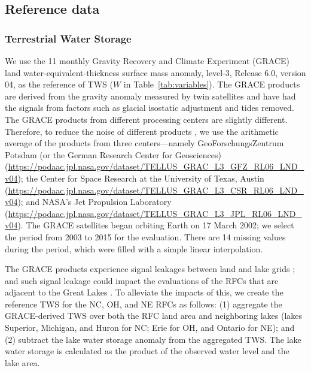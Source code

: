 \documentclass[essd, manuscript]{copernicus}
\begin{document}
\subsection{Reference data}\label{sec:methods:ref}

\subsubsection{Terrestrial Water Storage}\label{sec:methods:ref:tws}

We use the 1\degree{}\times{}1\degree{} monthly Gravity Recovery and Climate Experiment (GRACE) land water-equivalent-thickness surface mass anomaly, level-3, Release 6.0, version 04, as the reference of TWS (\(W\) in Table~\ref{tab:variables}). The GRACE products are derived from the gravity anomaly measured by twin satellites and have had the signals from factors such as glacial isostatic adjustment and tides removed. The GRACE products from different processing centers are slightly different. Therefore, to reduce the noise of different products \citep{sakumura2014GRL}, we use the arithmetic average of the products from three centers---namely GeoForschungsZentrum Potsdam (or the German Research Center for Geosciences) (\url{https://podaac.jpl.nasa.gov/dataset/TELLUS_GRAC_L3_GFZ_RL06_LND_v04}); the Center for Space Research at the University of Texas, Austin (\url{https://podaac.jpl.nasa.gov/dataset/TELLUS_GRAC_L3_CSR_RL06_LND_v04}); and NASA's Jet Propulsion Laboratory (\url{https://podaac.jpl.nasa.gov/dataset/TELLUS_GRAC_L3_JPL_RL06_LND_v04}). The GRACE satellites began orbiting Earth on 17 March 2002; we select the period from 2003 to 2015 for the evaluation. There are 14 missing values during the period, which were filled with a simple linear interpolation.

The GRACE products experience signal leakages between land and lake grids \citep{save2016JGRSE}; and such signal leakage could impact the evaluations of the RFCs that are adjacent to the Great Lakes \citep{ma2017JGRA}. To alleviate the impacts of this, we create the reference TWS for the NC, OH, and NE RFCs as follows: (1) aggregate the GRACE-derived TWS over both the RFC land area and neighboring lakes (lakes Superior, Michigan, and Huron for NC; Erie for OH, and Ontario for NE); and (2) subtract the lake water storage anomaly from the aggregated TWS. The lake water storage is calculated as the product of the observed water level and the lake area.
\end{document}
